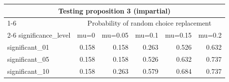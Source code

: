 \begin{table}[t]
\fontsize{12.0pt}{14.4pt}\selectfont
\begin{tabular*}{\linewidth}{@{\extracolsep{\fill}}lrrrrr}
\toprule
\multicolumn{6}{c}{Testing proposition 3 (impartial)} \\ 
\cmidrule(lr){1-6}
 & \multicolumn{5}{c}{Probability of random choice replacement} \\ 
\cmidrule(lr){2-6}
significance\_level & mu=0 & mu=0.05 & mu=0.1 & mu=0.15 & mu=0.2 \\ 
\midrule\addlinespace[2.5pt]
significant\_01 & 0.158 & 0.158 & 0.263 & 0.526 & 0.632 \\ 
significant\_05 & 0.158 & 0.158 & 0.526 & 0.632 & 0.737 \\ 
significant\_10 & 0.158 & 0.263 & 0.579 & 0.684 & 0.737 \\ 
\bottomrule
\end{tabular*}
\end{table}

